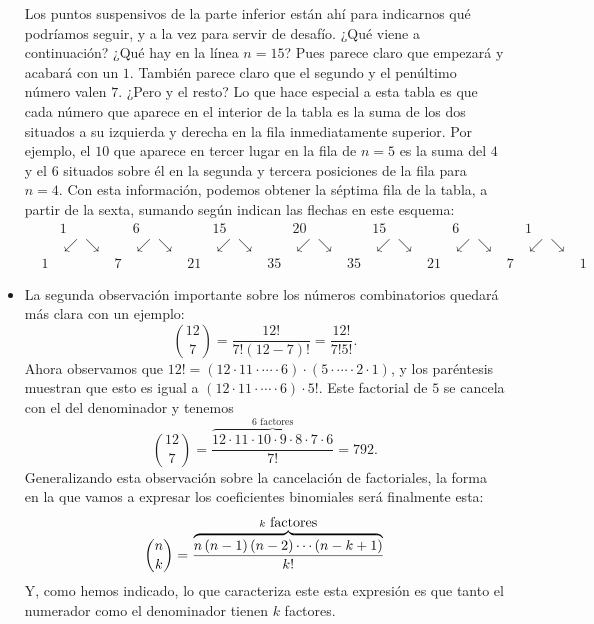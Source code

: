 \begin{itemize}
        Los puntos suspensivos de la parte inferior están ahí para indicarnos qué podríamos seguir, y a la vez para servir de desafío. ¿Qué viene a continuación? ¿Qué hay en la línea $n=15$? Pues parece claro que empezará y acabará con un $1$. También parece claro que el segundo y el penúltimo  número valen $7$. ¿Pero y el resto? Lo que hace especial a esta tabla es que {\sf cada número que aparece en el interior de la tabla es la suma de los dos situados a su izquierda y derecha en la fila inmediatamente superior.} Por ejemplo, el $10$ que aparece en tercer lugar en la fila de $n=5$  es la suma del $4$ y el $6$ situados sobre él en la  segunda y tercera posiciones de la fila para $n=4$. Con esta información, podemos obtener la séptima fila de la tabla, a partir de la sexta, sumando según indican las flechas en este esquema:
        {\small
        \[
        \begin{array}{lcccccccccccccccc}
        &&1&&6&&15&&20&&15&&6&&1\\
           &&\swarrow\searrow&&\swarrow\searrow&&\swarrow\searrow&&\swarrow\searrow&&\swarrow\searrow&&
           \swarrow\searrow&&\swarrow\searrow\\
        &1&&7&&21&&35&&35&&21&&7&&1
        \end{array}
        \]
        }
        \item La segunda observación importante sobre los números combinatorios quedará más clara con un ejemplo:
        \[
        \binom{12}{7}=\dfrac{12!}{7!(12-7)!}=\dfrac{12!}{7!5!}.
        \]
        Ahora observamos que $12!=(12\cdot 11\cdot\cdots\cdot 6)\cdot(5\cdot\cdots\cdot 2\cdot 1)$, y los paréntesis muestran que esto
        es igual a $(12\cdot 11\cdot\cdots\cdot 6)\cdot 5!$. Este factorial de $5$ se cancela con el del denominador y tenemos
        \[
        \binom{12}{7}=\dfrac{\overbrace{12\cdot 11\cdot 10\cdot 9\cdot 8\cdot 7\cdot 6}^{6\mbox{ factores}}}{7!}=792.
        \]
        Generalizando esta observación sobre la cancelación de factoriales, la forma en la que vamos a expresar los coeficientes binomiales será finalmente esta:
        \begin{equation}\label{cap03:ecu:expresionPseudoFactorialCoeficientesBinomiales}
        \dbinom{n}{k}=\frac{\overbrace{n\left( n-1\right) \left( n-2\right) \cdots \left( n-k+1\right) }^{k\mbox{ factores}}}{k!}
        \end{equation}
        Y, como hemos indicado, lo que caracteriza este esta expresión es que tanto el numerador como el denominador tienen $k$ factores.
    \end{itemize}

